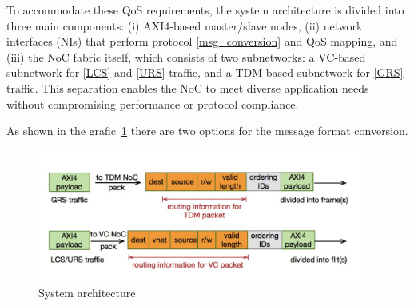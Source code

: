To accommodate these QoS requirements, the system architecture is divided into three main components: (i) AXI4-based master/slave nodes, (ii) network interfaces (NIs) that perform protocol \ref{msg_conversion} and QoS mapping, and (iii) the NoC fabric itself, which consists of two subnetworks: a VC-based subnetwork for \ref{LCS} and \ref{URS} traffic, and a TDM-based subnetwork for \ref{GRS} traffic. 
This separation enables the NoC to meet diverse application needs without compromising performance or protocol compliance.

\label{msg_conversion}
As shown in the grafic~\ref{fig:message_format} there are two options for the message format conversion. 

\begin{figure}[htbp]
    \centering
    \includegraphics[width=0.95\textwidth]{img/Message format conversion.png}
    \caption{System architecture}
    \label{fig:message_format}
\end{figure}
